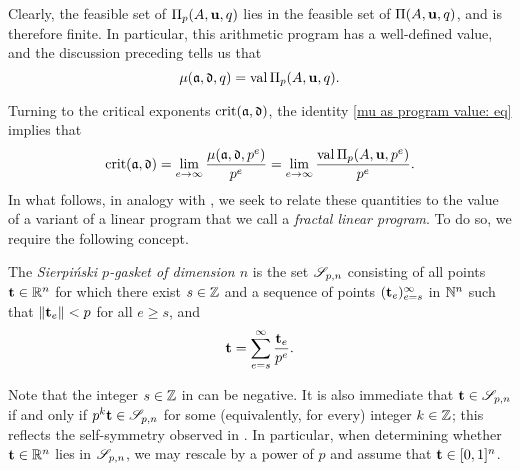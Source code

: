 \documentclass{amsart}
\begin{document}

Clearly, the feasible set of $\Pi_p(A, \mathbf{u}, q)$ lies in the feasible set of $\Pi(A, \mathbf{u},q)$, and is therefore finite.
In particular, this arithmetic program has a well-defined value, and the discussion preceding  tells us that
\begin{equation}
\label{mu as program value: eq}
\mu(\mathfrak{a},\mathfrak{d},q) = \operatorname{val} \Pi_p(A,\mathbf{u},q).
\end{equation}

Turning to the critical exponents $\operatorname{crit}(\mathfrak{a}, \mathfrak{d})$, the identity \eqref{mu as program value: eq} implies that
\begin{equation}
\label{crit as limit of normalized program values: eq}
\operatorname{crit}(\mathfrak{a},\mathfrak{d}) = \lim_{e\to\infty} \frac{\mu(\mathfrak{a},\mathfrak{d},p^e)}{p^e} = \lim_{e\to\infty} \frac{\operatorname{val} \Pi_p(A,\mathbf{u},p^e)}{p^e}.
\end{equation}
In what follows, in analogy with , we seek to relate these quantities to the value of a variant of a linear program that we call a \emph{fractal linear program}.  To do so, we require the following concept.

\begin{definition}
\label{sierpinski: D}
   The \emph{Sierpi\'nski $p$-gasket of dimension $n$} is the set $\mathscr{S}_{p,n}$ consisting of all points $\mathbf{t}\in \mathbb{R}^n$ for which there exist $s \in \mathbb{Z}$ and a sequence of points $( \mathbf{t}_e )_{e=s}^\infty$ in $\mathbb{N}^n$ such that $\| \mathbf{t}_e \| < p$ for all $e \geq s$, and
 \[
\mathbf{t} = \sum_{e=s}^{\infty} \frac{\mathbf{t}_e}{p^e}.
 \]
\end{definition}

Note that the integer $s \in \mathbb{Z}$ in  can be negative.
It is also immediate that $\mathbf{t} \in \mathscr{S}_{p,n}$ if and only if $p^k  \mathbf{t} \in \mathscr{S}_{p,n}$ for some (equivalently, for every) integer $k \in \mathbb{Z}$; this reflects the self-symmetry observed in .
In particular, when determining whether $\mathbf{t} \in \mathbb{R}^n$ lies in $\mathscr{S}_{p,n}$, we may rescale by a power of $p$  and assume that $\mathbf{t} \in [0,1]^n$.
\end{document}
